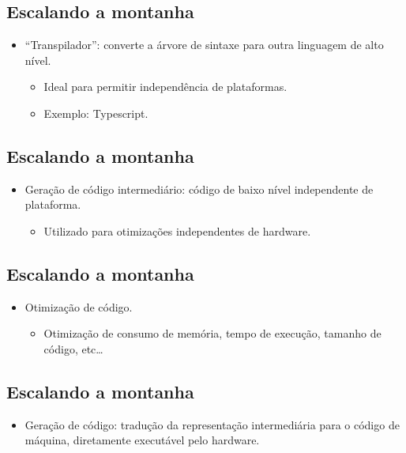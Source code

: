 \documentclass[11pt]{article}
\begin{document}
\subsection*{Escalando a montanha}
\label{sec:org8de6e07}

\begin{itemize}
\item ``Transpilador'': converte a árvore de sintaxe para outra linguagem de alto nível.
\begin{itemize}
\item Ideal para permitir independência de plataformas.
\item Exemplo: Typescript.
\end{itemize}
\end{itemize}
\subsection*{Escalando a montanha}
\label{sec:org7504826}

\begin{itemize}
\item Geração de código intermediário: código de baixo nível independente de plataforma.
\begin{itemize}
\item Utilizado para otimizações independentes de hardware.
\end{itemize}
\end{itemize}
\subsection*{Escalando a montanha}
\label{sec:orgd6d2d96}

\begin{itemize}
\item Otimização de código.
\begin{itemize}
\item Otimização de consumo de memória, tempo de execução, tamanho de código, etc\ldots{}
\end{itemize}
\end{itemize}
\subsection*{Escalando a montanha}
\label{sec:org9f6661c}

\begin{itemize}
\item Geração de código: tradução da representação intermediária para o código de máquina,
diretamente executável pelo hardware.
\end{itemize}
\end{document}
